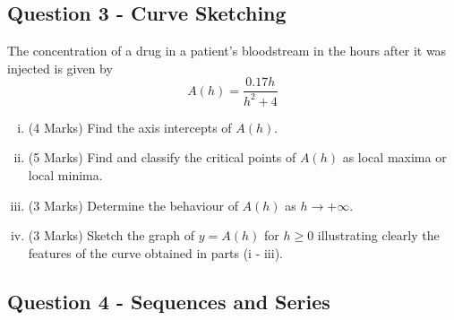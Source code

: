 \documentclass[a4paper,12pt]{article}
\begin{document}
\subsection*{Question 3 - Curve Sketching}
The concentration of a drug in a patient's bloodstream in the hours
after it was injected is given by
\[ A(h) = \frac{0.17h}{h^2 +4} \]
	
	\bigskip
\begin{enumerate}[(i)]
\item (4 Marks) Find the axis intercepts of $A(h)$.
	
	\bigskip
\item (5 Marks) Find and classify the critical points of $A(h)$ as local maxima or
local minima.
	
	\bigskip
\item (3 Marks) Determine the behaviour of $A(h)$ as $h \rightarrow + \infty$.
	
	\bigskip
	\item (3 Marks) Sketch the graph of $y = A(h)$ for $h \geq 0$ illustrating clearly
the features of the curve obtained in parts (i - iii).
	
	

\end{enumerate}


\newpage
\subsection*{Question 4 - Sequences and Series}

\end{document}
